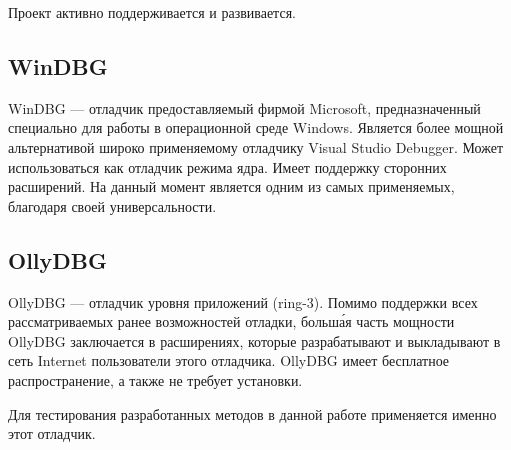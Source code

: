 Проект активно поддерживается и развивается.

\subsection{WinDBG}
WinDBG --- отладчик предоставляемый фирмой Microsoft, предназначенный специально
для работы в операционной среде Windows. Является более мощной альтернативой
широко применяемому отладчику Visual Studio Debugger. Может использоваться как
отладчик режима ядра. Имеет поддержку сторонних расширений. На данный момент
является одним из самых применяемых, благодаря своей универсальности.

\subsection{OllyDBG}
OllyDBG --- отладчик уровня приложений (ring-3). Помимо поддержки всех
рассматриваемых ранее возможностей отладки, больш\'{а}я часть мощности OllyDBG
заключается в расширениях, которые разрабатывают и выкладывают в сеть Internet
пользователи этого отладчика. OllyDBG имеет бесплатное распространение, а также
не требует установки. 

Для тестирования разработанных методов в данной работе применяется именно этот
отладчик.
